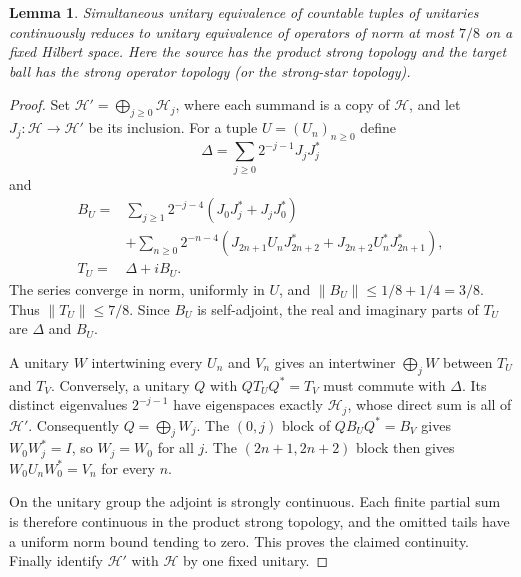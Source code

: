 \documentclass[11pt]{article}
\numberwithin{equation}{section}
\newtheorem{lemma}[theorem]{Lemma}
\theoremstyle{definition}
\begin{document}
\begin{lemma}\label{lem:tuple-coding}
Simultaneous unitary equivalence of countable tuples of unitaries
continuously reduces to unitary equivalence of operators of norm at most
$7/8$ on a fixed Hilbert space. Here the source has the product strong
topology and the target ball has the strong operator topology (or the
strong-star topology).
\end{lemma}
\begin{proof}
Set $\mathcal H'=\bigoplus_{j\ge0}\mathcal H_j$, where each summand is a
copy of $\mathcal H$, and let $J_j:\mathcal H\to\mathcal H'$ be its
inclusion. For a tuple $U=(U_n)_{n\ge0}$ define
\[
 \Delta=\sum_{j\ge0}2^{-j-1}J_jJ_j^*
\]
and
\begin{align*}
 B_U={}&\sum_{j\ge1}2^{-j-4}(J_0J_j^*+J_jJ_0^*)\\
 &+\sum_{n\ge0}2^{-n-4}
 (J_{2n+1}U_nJ_{2n+2}^*+J_{2n+2}U_n^*J_{2n+1}^*),\\
 T_U={}&\Delta+iB_U.
\end{align*}
The series converge in norm, uniformly in $U$, and
$\|B_U\|\le1/8+1/4=3/8$. Thus $\|T_U\|\le7/8$.
Since $B_U$ is self-adjoint, the real and imaginary parts of $T_U$
are $\Delta$ and $B_U$.

A unitary $W$ intertwining every $U_n$ and $V_n$ gives an intertwiner
$\bigoplus_j W$ between $T_U$ and $T_V$.
Conversely, a unitary $Q$ with $QT_UQ^*=T_V$ must commute with $\Delta$.
Its distinct eigenvalues $2^{-j-1}$ have eigenspaces exactly
$\mathcal H_j$, whose direct sum is all of $\mathcal H'$. Consequently
$Q=\bigoplus_j W_j$. The $(0,j)$ block of $QB_UQ^*=B_V$ gives
$W_0W_j^*=I$, so $W_j=W_0$ for all $j$. The $(2n+1,2n+2)$ block then
gives $W_0U_nW_0^*=V_n$ for every $n$.

On the unitary group the adjoint is strongly continuous. Each finite
partial sum is therefore continuous in the product strong topology,
and the omitted tails have a uniform norm bound tending to zero.
This proves the claimed continuity. Finally identify $\mathcal H'$
with $\mathcal H$ by one fixed unitary.
\end{proof}
\end{document}
